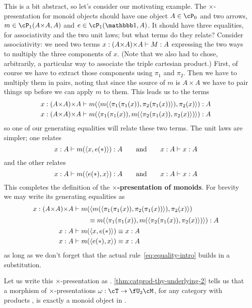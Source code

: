 This is a bit abstract, so let's consider our motivating example.
The $\times$-presentation for monoid objects should have one object $A\in\cP_0$ and two arrows, $m\in \cP_1(A\times A,A)$ and $e\in\cP_1(\unit,A)$.
It should have three equalities, for associativity and the two unit laws; but what terms do they relate?
Consider associativity: we need two terms $x:(A\times A)\times A \types M:A$ expressing the two ways to multiply the three components of $x$.
(Note that we also had to chose, arbitrarily, a particular way to associate the triple cartesian product.)
First, of course we have to extract those components using $\pi_1$ and $\pi_2$.
Then we have to multiply them in pairs, noting that since the source of $m$ is $A\times A$ we have to pair things up before we can apply $m$ to them.
This leads us to the terms
\begin{align*}
  x:(A\times A)\times A &\types m(\pair{m(\pair{\pi_1(\pi_1(x))}{\pi_2(\pi_1(x))})}{\pi_2(x)}) : A\\
  x:(A\times A)\times A &\types m(\pair{\pi_1(\pi_1(x))}{m(\pair{\pi_2(\pi_1(x))}{\pi_2(x)})}) : A
\end{align*}
so one of our generating equalities will relate these two terms.
The unit laws are simpler; one relates
\[ x:A \vdash m(\langle x,e(\mathord{\ast})\rangle):A \qquad\text{and}\qquad x:A \vdash x:A \]
and the other relates
\[ x:A \vdash m(\langle e(\mathord{\ast}),x\rangle):A \qquad\text{and}\qquad x:A \vdash x:A \]
This completes the definition of the \textbf{$\times$-presentation of monoids}.
For brevity we may write its generating equalities as
\begin{align*}
  x:(A\times A)\times A &\types
                          \begin{multlined}[t]
                            m(\pair{m(\pair{\pi_1(\pi_1(x))}{\pi_2(\pi_1(x))})}{\pi_2(x)}) \\[\jot]
                            \equiv
                            m(\pair{\pi_1(\pi_1(x))}{m(\pair{\pi_2(\pi_1(x))}{\pi_2(x)})}) : A
                          \end{multlined}\\
  x:A &\types m(\pair{x}{e(\ttt)}) \equiv x:A\\
  x:A &\types m(\pair{e(\ttt)}{x}) \equiv x:A
\end{align*}
as long as we don't forget that the actual rule~\eqref{eq:equality-intro} builds in a substitution.

Let us write this $\times$-presentation as \cT.
\cref{thm:catprod-thy-underlying-2} tells us that a morphism of $\times$-presentations $\pfree:\cT \to \fU_2\cM$, for any category with products \cM, is exactly a monoid object in \cM.

